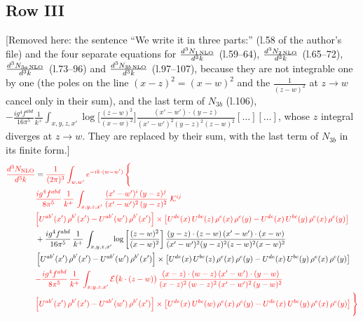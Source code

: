 \documentclass[9pt]{article}
\numberwithin{equation}{section}
\begin{document}
\subsection{Row III}
{\color{orange}[Removed here: the sentence ``We write it in three parts:'' (l.58 of the author's file) and the four separate equations for $\frac{d^{3}N_{1\,\rm NLO}}{d^{3}k}$ (l.59--64), $\frac{d^{3}N_{2\,\rm NLO}}{d^{3}k}$ (l.65--72), $\frac{d^{3}N_{3a\,\rm NLO}}{d^{3}k}$ (l.73--96) and $\frac{d^{3}N_{3b\,\rm NLO}}{d^{3}k}$ (l.97--107), because they are not integrable one by one (the poles on the line $(x-z)^{2}=(x-w)^{2}$ and the $\frac{1}{(z-w)^{2}}$ at $z\to w$ cancel only in their sum), and the last term of $N_{3b}$ (l.106), $-\frac{ig^{4}f^{abd}}{16\pi^{5}}\frac{1}{k^{+}}\int_{x,y,z,x'}\log\big[\frac{(z-w)^{2}}{(x-w)^{2}}\big]\frac{(x'-w')\cdot(y-z)}{(x'-w')^{2}(y-z)^{2}(z-w)^{2}}[\dots][\dots]$, whose $z$ integral diverges at $z\to w$. They are replaced by their sum, with the last term of $N_{3b}$ in its finite form.]}
\begin{align}
{\color{red}\frac{d^{3}N_{\rm NLO}}{d^{3}k}} & = {\color{red}\frac{1}{(2\pi)^{3}}\int_{w,w'}e^{-ik\cdot(w-w')}\,\Bigg\{}\notag \\
& {\color{red}\frac{ig^{4}f^{abd}}{8\pi^{5}}\,\frac{1}{k^{+}}\,\int_{x,y,z,x'}\frac{(x'-w')^{i}\,(y-z)^{j}}{(x'-w')^{2}\,(y-z)^{2}}\;\mathcal{K}^{ij}}\notag \\ & {\color{red}\left[U^{ab'}(x')\,\rho^{b'}(x')-U^{ab'}(w')\, \rho^{b'}(x')\right]\times \left[U^{de}(x)\,U^{bc}(z)\, \rho^{e}(x)\,\rho^{c}(y)-U^{de}(x)\,U^{bc}(y)\,\rho^{e}(x)\,\rho^{c}(y)\right]}\notag \\
&+ \frac{ig^{4}f^{abd}}{16\pi^{5}}\,\frac{1}{k^{+}}\,\int_{x,y,z,x'}\log{\left[\frac{(z-w)^{2}}{(x-w)^{2}}\right]}\,
\frac{(y-z)\cdot(z-w)\,(x'-w')\cdot(x-w)}{(x'-w')^{2}(y-z)^{2}(z-w)^{2}(x-w)^{2}}\notag \\ 
& \left[U^{ab'}(x')\,\rho^{b'}(x')-U^{ab'}(w')\, \rho^{b'}(x')\right]\times \left[U^{de}(x)\,U^{bc}(z)\, \rho^{e}(x)\,\rho^{c}(y)-U^{de}(x)\,U^{bc}(y)\,\rho^{e}(x)\,\rho^{c}(y)\right]\notag \\
& {\color{red}-\frac{ig^{4}f^{abd}}{8\pi^{5}}\,\frac{1}{k^{+}}\,\int_{x,y,z,x'}\mathcal{E}\big(k\cdot(z-w)\big)\,\frac{(x-z)\cdot(w-z)\,(x'-w')\cdot(y-w)}{(x-z)^{2}\,(w-z)^{2}\,(x'-w')^{2}\,(y-w)^{2}}}\notag \\ & {\color{red}\left[U^{ab'}(x')\,\rho^{b'}(x')-U^{ab'}(w')\, \rho^{b'}(x')\right]\times \left[U^{de}(x)\,U^{bc}(w)\, \rho^{e}(x)\,\rho^{c}(y)-U^{de}(x)\,U^{bc}(y)\,\rho^{e}(x)\,\rho^{c}(y)\right]\Bigg\}}
\end{align}
\end{document}
